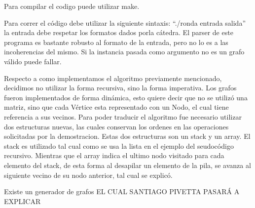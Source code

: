 Para compilar el codigo puede utilizar make.

Para correr el código debe utilizar la siguiente sintaxis: ``./ronda entrada salida'' la entrada debe respetar los formatos dados porla cátedra. El parser de este programa es bastante robusto al formato de la entrada, pero no lo es a las incoherencias del mismo. Si la instancia pasada como argumento no es un grafo válido puede fallar.

Respecto a como implementamos el algoritmo previamente mencionado, decidimos no utilizar la forma recursiva, sino la forma imperativa. Los grafos fueron implementados de forma dinámica, esto quiere decir que no se utilizó una matriz, sino que cada Vértice esta representado con un Nodo, el cual tiene referencia a sus vecinos. Para poder traducir el algoritmo fue necesario utilizar dos estructuras nuevas, las cuales conservan los ordenes en las operaciones solicitadas por la demostracion. Estas dos estructuras son un stack y un array. El stack es utilizado tal cual como se usa la lista en el ejemplo del seudocódigo recursivo. Mientras que el array indica el ultimo nodo visitado para cada elemento del stack, de esta forma al desapilar un elemento de la pila, se avanza al siguiente vecino de su nodo anterior, tal cual se explicó.

Existe un generador de grafos EL CUAL SANTIAGO PIVETTA PASARÁ A EXPLICAR
